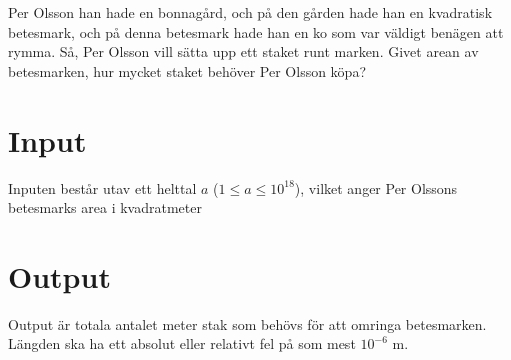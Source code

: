 
%
Per Olsson han hade en bonnagård, och på den gården hade han en kvadratisk
betesmark, och på denna betesmark hade han en ko som var väldigt benägen
att rymma. Så, Per Olsson vill sätta upp ett staket runt marken.
Givet arean av betesmarken, hur mycket staket behöver Per Olsson
köpa?

\section*{Input}

Inputen består utav ett helttal $a$ ($1 \le a \le 10^{18}$), vilket anger Per Olssons
betesmarks area i kvadratmeter

\section*{Output}

Output är totala antalet meter stak som behövs för att omringa betesmarken.
Längden ska ha ett absolut eller relativt fel på som mest $10^{-6}$ m.
